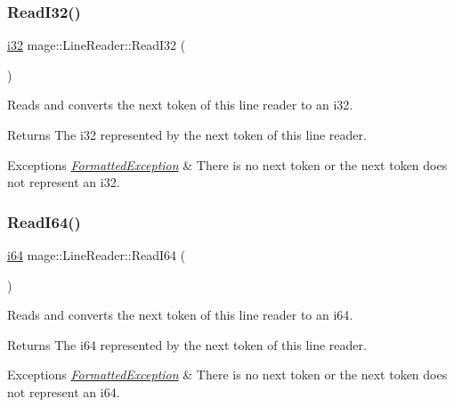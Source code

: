 \subsubsection{\texorpdfstring{Read\+I32()}{ReadI32()}}
{\footnotesize\ttfamily \hyperlink{namespacemage_ad59a7dbc22c51c308b6df9e9c3cafd62}{i32} mage\+::\+Line\+Reader\+::\+Read\+I32 (\begin{DoxyParamCaption}{ }\end{DoxyParamCaption})\hspace{0.3cm}{\ttfamily [protected]}}

Reads and converts the next token of this line reader to an {\ttfamily i32}.

\begin{DoxyReturn}{Returns}
The {\ttfamily i32} represented by the next token of this line reader. 
\end{DoxyReturn}

\begin{DoxyExceptions}{Exceptions}
{\em \hyperlink{structmage_1_1_formatted_exception}{Formatted\+Exception}} & There is no next token or the next token does not represent an {\ttfamily i32}. \\
\hline
\end{DoxyExceptions}
\hypertarget{classmage_1_1_line_reader_ae72be27dd23886104099f8cf2e2a162a}{}\label{classmage_1_1_line_reader_ae72be27dd23886104099f8cf2e2a162a} 
\subsubsection{\texorpdfstring{Read\+I64()}{ReadI64()}}
{\footnotesize\ttfamily \hyperlink{namespacemage_a3d629c1ab28148a782661e5b14b6fe5e}{i64} mage\+::\+Line\+Reader\+::\+Read\+I64 (\begin{DoxyParamCaption}{ }\end{DoxyParamCaption})\hspace{0.3cm}{\ttfamily [protected]}}

Reads and converts the next token of this line reader to an {\ttfamily i64}.

\begin{DoxyReturn}{Returns}
The {\ttfamily i64} represented by the next token of this line reader. 
\end{DoxyReturn}

\begin{DoxyExceptions}{Exceptions}
{\em \hyperlink{structmage_1_1_formatted_exception}{Formatted\+Exception}} & There is no next token or the next token does not represent an {\ttfamily i64}. \\
\hline
\end{DoxyExceptions}
\hypertarget{classmage_1_1_line_reader_ae637eb40ceb12c86325ccf01c00d93de}{}\label{classmage_1_1_line_reader_ae637eb40ceb12c86325ccf01c00d93de} 
